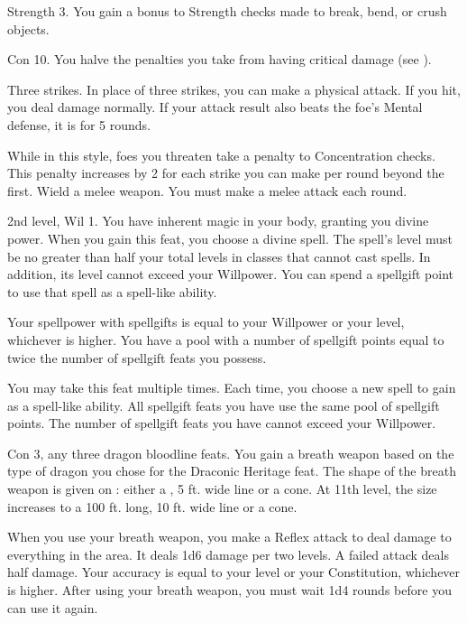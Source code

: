 \featpre Strength 3.
\featben You gain a  bonus to Strength checks made to break, bend, or crush objects.

\featpre Con 10.
\featben You halve the penalties you take from having critical damage (see ).

\featpre Three strikes.
\featben In place of three strikes, you can make a physical attack.
If you hit, you deal damage normally.
If your attack result also beats the foe's Mental defense, it is \disoriented for 5 rounds.

\featben While in this style, foes you threaten take a  penalty to Concentration checks.
This penalty increases by 2 for each strike you can make per round beyond the first.
\stylereq Wield a melee weapon. You must make a melee attack each round.

\featpres 2nd level, Wil 1.
\featben You have inherent magic in your body, granting you divine power.
When you gain this feat, you choose a divine spell.
The spell's level must be no greater than half your total levels in classes that cannot cast spells.
In addition, its level cannot exceed your Willpower.
You can spend a spellgift point to use that spell as a spell-like ability.

Your spellpower with spellgifts is equal to your Willpower or your level, whichever is higher.
You have a pool with a number of spellgift points equal to twice the number of spellgift feats you possess.

You may take this feat multiple times.
Each time, you choose a new spell to gain as a spell-like ability.
All spellgift feats you have use the same pool of spellgift points.
The number of spellgift feats you have cannot exceed your Willpower.

\featpres Con 3, any three dragon bloodline feats.
\featben You gain a breath weapon based on the type of dragon you chose for the Draconic Heritage feat.
The shape of the breath weapon is given on : either a \arealarge, 5 ft. wide line or a \areamed cone.
At 11th level, the size increases to a 100 ft. long, 10 ft. wide line or a \arealarge cone.

When you use your breath weapon, you make a Reflex attack to deal damage to everything in the area.
It deals 1d6 damage per two levels.
A failed attack deals half damage.
Your accuracy is equal to your level or your Constitution, whichever is higher.
After using your breath weapon, you must wait 1d4 rounds before you can use it again.

